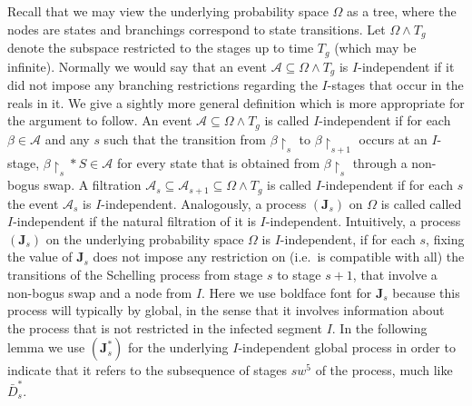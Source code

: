 \documentclass[11pt]{article}
\theoremstyle{plain}
\numberwithin{equation}{subsection}
\newcommand{\restr}{\upharpoonright}  \newcommand{\un}{\uparrow} \newcommand{\de}{\downarrow} \DeclarePairedDelimiter{\ceil}{\lceil}{\rceil}
\newcommand{\JJ}{\mathbf{J}}
\begin{document}
Recall that we may view the underlying probability space $\Omega$ as a tree, where the
nodes are states and  branchings correspond to state transitions. Let
$\Omega\wedge T_g$ denote the subspace restricted to the stages up to time $T_g$ (which may be infinite).
Normally we would say that an event
$\mathcal{A}\subseteq \Omega\wedge T_g$ is $I$-independent if
it did not impose any branching restrictions regarding the $I$-stages that occur in the reals in it.
We give a sightly more general definition which is more appropriate for the argument to follow.
An event $\mathcal{A}\subseteq \Omega\wedge T_g$ is called $I$-independent if for each 
$\beta\in \mathcal{A}$ and any $s$ such that
the transition from $\beta\restr_{s}$ to $\beta\restr_{s+1}$ occurs at an $I$-stage,
 $\beta\restr_{s}\ast S\in \mathcal{A}$ for every state that is obtained from $\beta\restr_s$ through a 
 non-bogus swap.
A filtration $\mathcal{A}_s\subseteq \mathcal{A}_{s+1} \subseteq \Omega\wedge T_g$ is 
called $I$-independent if  for each $s$ the event  $\mathcal{A}_s$ is $I$-independent.
Analogously, a process $(\JJ_s)$ on $\Omega$ is called
called $I$-independent if the natural filtration of it is $I$-independent.
Intuitively, a process $(\JJ_s)$ on the underlying probability space $\Omega$ is $I$-independent, 
if for each $s$, fixing the value of $\JJ_s$ does not impose any restriction on (i.e.\ is compatible with all) 
the transitions of the Schelling process from stage $s$ to stage $s+1$, that involve a non-bogus swap
and a node from $I$.  Here we use boldface font for $\JJ_s$ because this process 
will typically by global, in the sense that it involves information about
the process that is not restricted in the infected segment $I$.
In the following lemma we use $(\JJ^{\ast}_s)$ for the underlying $I$-independent global process
in order to indicate that it refers to the subsequence of stages $sw^5$ of the process, much like
$\bar{D}_{s}^{\ast}$.
\end{document}
